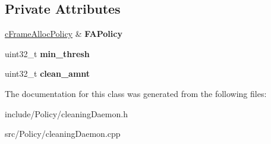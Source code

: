 \subsection*{\-Private \-Attributes}
\begin{DoxyCompactItemize}
\item 
\hypertarget{classcCleanDaemon_a175b113f2f0f943199348e7f1f55252e}{\hyperlink{classcFrameAllocPolicy}{c\-Frame\-Alloc\-Policy} \& {\bfseries \-F\-A\-Policy}}\label{d3/d6f/classcCleanDaemon_a175b113f2f0f943199348e7f1f55252e}

\item 
\hypertarget{classcCleanDaemon_aa02439f18adb8dc65b2595eb7ae99158}{uint32\-\_\-t {\bfseries min\-\_\-thresh}}\label{d3/d6f/classcCleanDaemon_aa02439f18adb8dc65b2595eb7ae99158}

\item 
\hypertarget{classcCleanDaemon_af193b6bcae4c81485b62cba8c413c7ab}{uint32\-\_\-t {\bfseries clean\-\_\-amnt}}\label{d3/d6f/classcCleanDaemon_af193b6bcae4c81485b62cba8c413c7ab}

\end{DoxyCompactItemize}


\-The documentation for this class was generated from the following files\-:\begin{DoxyCompactItemize}
\item 
include/\-Policy/cleaning\-Daemon.\-h\item 
src/\-Policy/cleaning\-Daemon.\-cpp\end{DoxyCompactItemize}

